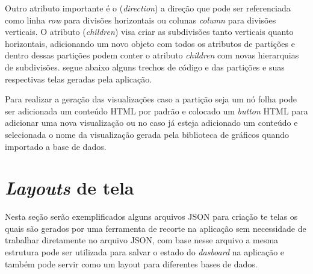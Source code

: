 \documentclass[
	12pt,				%
	openright,			%
	oneside,			%
	a4paper,			%
	english,			%
	brazil				%
	]{abntex2}
\begin{document}
Outro atributo importante é o (\textit{direction}) a direção que pode ser referenciada como linha \textit{row} para divisões horizontais ou colunas \textit{column} para divisões verticais. O atributo (\textit{children}) visa criar as subdivisões tanto verticais quanto horizontais, adicionando um novo objeto com todos os atributos de partições e dentro dessas partições podem conter o atributo \textit{children} com novas hierarquias de subdivisões. segue abaixo alguns trechos de código e das partições e suas respectivas telas geradas pela aplicação. 

Para realizar a geração das visualizações caso a partição seja um nó folha pode ser adicionada um conteúdo HTML por padrão e colocado um \textit{button} HTML para adicionar uma nova visualização ou no caso já esteja adicionado um conteúdo e selecionada o nome da visualização gerada pela biblioteca de gráficos quando importado a base de dados.

\section{ \textit{Layouts} de tela} 
Nesta seção serão exemplificados alguns arquivos JSON para criação te telas os quais são gerados por uma ferramenta de recorte na aplicação sem necessidade de trabalhar diretamente no arquivo JSON, com base nesse arquivo a mesma estrutura pode ser utilizada para salvar o estado do \textit{dasboard} na aplicação e também pode servir como um layout para diferentes bases de dados.
\end{document}

